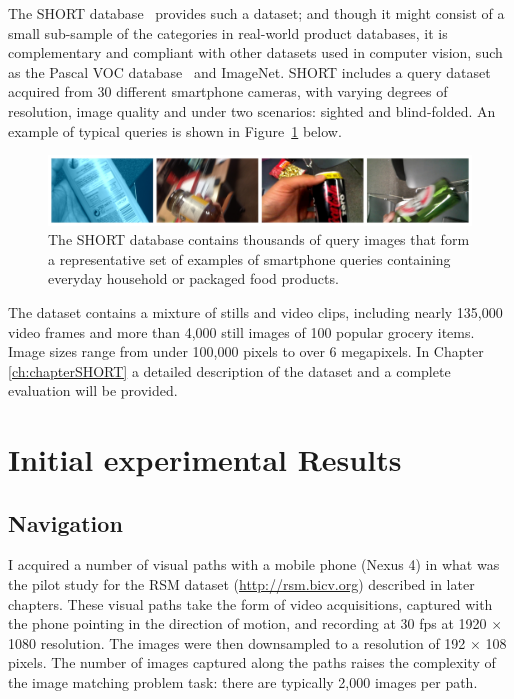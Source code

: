 The SHORT database~\cite{Rivera-Rubio2013a} provides such a dataset; and though it might consist of a small sub-sample of the categories in real-world product databases, it is  complementary and compliant with other datasets used in computer vision, such as the Pascal VOC database~\cite{Everingham2009} and ImageNet.  SHORT includes a query dataset acquired from 30 different smartphone cameras, with varying degrees of resolution, image quality and under two scenarios: sighted and blind-folded.  An example of typical queries is shown in Figure~\ref{fig:ShortQueries} below.

\begin{figure}
\centering
\includegraphics[width=\textwidth]{./gfx/Chapter02/TestDatasetCollage4imgs.jpg}
\caption{The SHORT database contains thousands of query images that form a representative set of examples of smartphone queries containing everyday household or packaged food products.}
\label{fig:ShortQueries}
\end{figure}

The dataset contains a mixture of stills and video clips, including nearly 135,000 video frames and more than 4,000 still images of 100 popular grocery items.  Image sizes range from under 100,000 pixels to over 6 megapixels. In Chapter \ref{ch:chapterSHORT} a detailed description of the dataset and a complete evaluation will be provided.



\section{Initial experimental Results} \label{sec:expResults}

\subsection{Navigation}

I acquired a number of visual paths with a mobile phone (Nexus 4) in what was the pilot study for the RSM dataset (\url{http://rsm.bicv.org}) described in later chapters.  These visual paths take the form of video acquisitions, captured with the phone pointing in the direction of motion, and recording at 30 fps at 1920 $\times$ 1080 resolution. The images were then downsampled to a resolution of 192 $\times$ 108 pixels. The number of images captured along the paths raises the complexity of the image matching problem task: there are typically 2,000 images per path.

